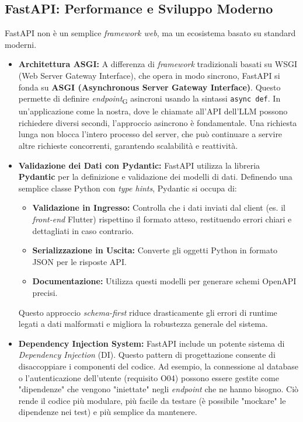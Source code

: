 \subsection{FastAPI: Performance e Sviluppo Moderno}
FastAPI non è un semplice \textit{framework web}, ma un ecosistema basato su standard moderni.
\begin{itemize}
    \item \textbf{Architettura ASGI:} A differenza di \textit{framework} tradizionali basati su WSGI (Web Server Gateway Interface), che opera in modo sincrono, FastAPI si fonda su \textbf{ASGI (Asynchronous Server Gateway Interface)}. Questo permette di definire \textit{endpoint}\textsubscript{G} asincroni usando la sintassi \verb|async def|. In un'applicazione come la nostra, dove le chiamate all'API dell'LLM possono richiedere diversi secondi, l'approccio asincrono è fondamentale. Una richiesta lunga non blocca l'intero processo del server, che può continuare a servire altre richieste concorrenti, garantendo scalabilità e reattività.

    \item \textbf{Validazione dei Dati con Pydantic:} FastAPI utilizza la libreria \textbf{Pydantic} per la definizione e validazione dei modelli di dati. Definendo una semplice classe Python con \textit{type hints}, Pydantic si occupa di:
    \begin{itemize}
        \item \textbf{Validazione in Ingresso:} Controlla che i dati inviati dal client (es. il \textit{front-end} Flutter) rispettino il formato atteso, restituendo errori chiari e dettagliati in caso contrario.
        \item \textbf{Serializzazione in Uscita:} Converte gli oggetti Python in formato JSON per le risposte API.
        \item \textbf{Documentazione:} Utilizza questi modelli per generare schemi OpenAPI precisi.
    \end{itemize}
    Questo approccio \textit{schema-first} riduce drasticamente gli errori di runtime legati a dati malformati e migliora la robustezza generale del sistema.

    \item \textbf{Dependency Injection System:} FastAPI include un potente sistema di \textit{Dependency Injection} (DI). Questo pattern di progettazione consente di disaccoppiare i componenti del codice. Ad esempio, la connessione al database o l'autenticazione dell'utente (requisito O04) possono essere gestite come "dipendenze" che vengono "iniettate" negli \textit{endpoint} che ne hanno bisogno. Ciò rende il codice più modulare, più facile da testare (è possibile "mockare" le dipendenze nei test) e più semplice da mantenere.
\end{itemize}

